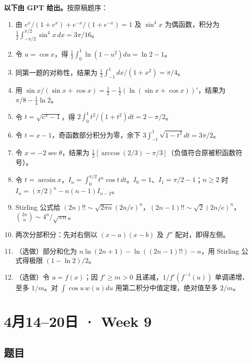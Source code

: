 \documentclass[UTF8,11pt, a4paper, oneside, fontset=none]{ctexbook}
\begin{document}
\noindent\textbf{以下由 GPT 给出。}按原稿题序：
\begin{enumerate}
\item 由 $e^x/(1+e^x)+e^{-x}/(1+e^{-x})=1$ 及 $\sin^4x$ 为偶函数，积分为 $\frac12\int_{-\pi/2}^{\pi/2}\sin^4x\,dx=3\pi/16$。
\item 令 $u=\cos x$，得 $\frac12\int_0^1\ln(1-u^2)du=\ln2-1$。
\item 同第一题的对称性，结果为 $\frac12\int_{-1}^1dx/(1+x^2)=\pi/4$。
\item 用 $\sin x/(\sin x+\cos x)=\frac12-\frac12(\ln(\sin x+\cos x))'$，结果为 $\pi/8-\frac14\ln2$。
\item 令 $t=\sqrt{e^x-1}$，得 $2\int_0^1t^2/(1+t^2)dt=2-\pi/2$。
\item 令 $t=x-1$，奇函数部分积分为零，余下 $3\int_{-1}^1\sqrt{1-t^2}dt=3\pi/2$。
\item 令 $x=-2\sec\theta$，结果为 $\frac12[\arccos(2/3)-\pi/3]$（负值符合原被积函数符号）。
\item 令 $t=\arcsin x$，$I_n=\int_0^{\pi/2}t^n\cos t\,dt$。$I_0=1$、$I_1=\pi/2-1$；$n\ge2$ 时 $I_n=(\pi/2)^n-n(n-1)I_{n-2}$。
\item Stirling 公式给 $(2n)!!\sim\sqrt{2\pi n}(2n/e)^n$，$(2n-1)!!\sim\sqrt2(2n/e)^n$，$\binom{2n}{n}\sim4^n/\sqrt{\pi n}$。
\item 两次分部积分：先对右侧以 $(x-a)(x-b)$ 及 $f''$ 配对，即得左侧。
\item（选做）部分和化为 $n\ln(2n+1)-\ln((2n-1)!!)-n$，用 Stirling 公式得极限 $(1-\ln2)/2$。
\item（选做）令 $u=f(x)$；因 $f'\ge m>0$ 且递减，$1/f'(f^{-1}(u))$ 单调递增、至多 $1/m$。对 $\int\cos u\,w(u)du$ 用第二积分中值定理，绝对值至多 $2/m$。
\end{enumerate}

\clearpage

\section{4月14--20日 · Week 9}

\subsection*{题目}
\end{document}
